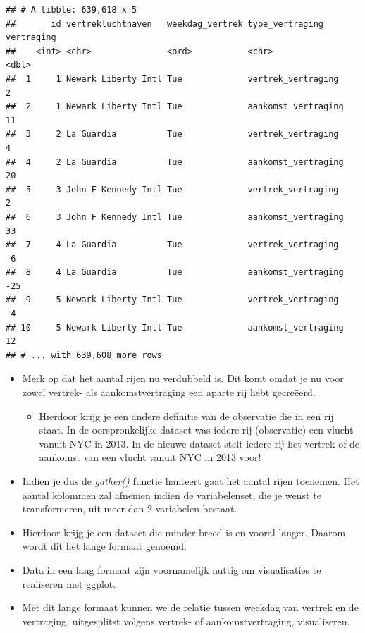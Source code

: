 \documentclass[]{tufte-book}
\providecommand{\tightlist}{%
  \setlength{\itemsep}{0pt}\setlength{\parskip}{0pt}}
\begin{document}
\begin{verbatim}
## # A tibble: 639,618 x 5
##       id vertrekluchthaven   weekdag_vertrek type_vertraging     vertraging
##    <int> <chr>               <ord>           <chr>                    <dbl>
##  1     1 Newark Liberty Intl Tue             vertrek_vertraging           2
##  2     1 Newark Liberty Intl Tue             aankomst_vertraging         11
##  3     2 La Guardia          Tue             vertrek_vertraging           4
##  4     2 La Guardia          Tue             aankomst_vertraging         20
##  5     3 John F Kennedy Intl Tue             vertrek_vertraging           2
##  6     3 John F Kennedy Intl Tue             aankomst_vertraging         33
##  7     4 La Guardia          Tue             vertrek_vertraging          -6
##  8     4 La Guardia          Tue             aankomst_vertraging        -25
##  9     5 Newark Liberty Intl Tue             vertrek_vertraging          -4
## 10     5 Newark Liberty Intl Tue             aankomst_vertraging         12
## # ... with 639,608 more rows
\end{verbatim}

\begin{itemize}
\tightlist
\item
  Merk op dat het aantal rijen nu verdubbeld is. Dit komt omdat je nu voor zowel vertrek- als aankomstvertraging een aparte rij hebt gecreëerd.

  \begin{itemize}
  \tightlist
  \item
    Hierdoor krijg je een andere definitie van de observatie die in een rij staat. In de oorspronkelijke dataset was iedere rij (observatie) een vlucht vanuit NYC in 2013. In de nieuwe dataset stelt iedere rij het vertrek of de aankomst van een vlucht vanuit NYC in 2013 voor!
  \end{itemize}
\item
  Indien je dus de \emph{gather()} functie hanteert gaat het aantal rijen toenemen. Het aantal kolommen zal afnemen indien de variabelenset, die je wenst te transformeren, uit meer dan 2 variabelen bestaat.
\item
  Hierdoor krijg je een dataset die minder breed is en vooral langer. Daarom wordt dit het lange formaat genoemd.
\item
  Data in een lang formaat zijn voornamelijk nuttig om visualisaties te realiseren met ggplot.
\item
  Met dit lange formaat kunnen we de relatie tussen weekdag van vertrek en de vertraging, uitgesplitst volgens vertrek- of aankomstvertraging, visualiseren.
\end{itemize}
\end{document}
